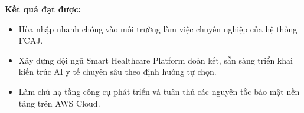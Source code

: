 \vspace{0.5em}\noindent\textbf{Kết quả đạt được:}

\begin{itemize}
\tightlist
\item
  Hòa nhập nhanh chóng vào môi trường làm việc chuyên nghiệp của hệ
  thống FCAJ.
\item
  Xây dựng đội ngũ Smart Healthcare Platform đoàn kết, sẵn sàng triển
  khai kiến trúc AI y tế chuyên sâu theo định hướng tự chọn.
\item
  Làm chủ hạ tầng công cụ phát triển và tuân thủ các nguyên tắc bảo mật
  nền tảng trên AWS Cloud.
\end{itemize}
